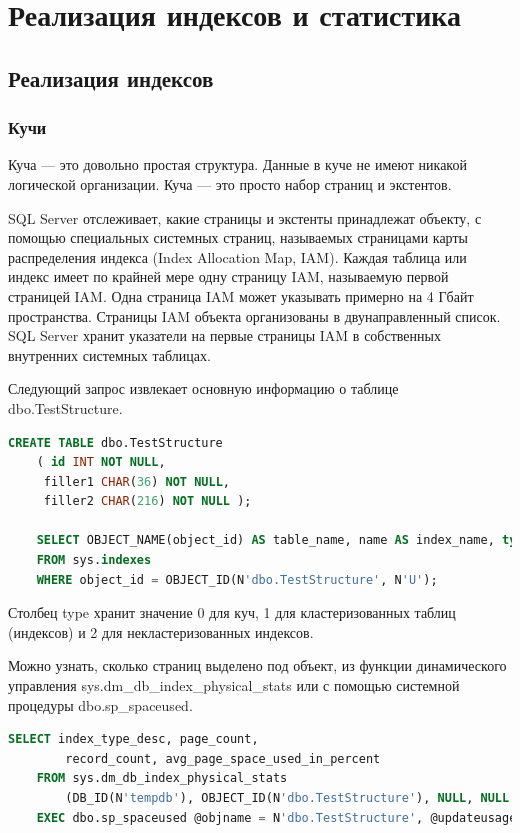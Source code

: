 \chapter{Реализация индексов и статистика}
\section{Реализация индексов}
\subsection{Кучи}

Куча — это довольно простая структура. Данные в куче не имеют никакой
логической организации. Куча — это просто набор страниц и экстентов. 

SQL Server отслеживает, какие страницы и экстенты принадлежат объекту, с помощью специальных системных страниц, называемых страницами карты распределения индекса (Index Allocation Map, IAM). Каждая таблица или индекс имеет по
крайней мере одну страницу IAM, называемую первой страницей IAM. Одна страница IAM может указывать примерно на 4 Гбайт пространства. Страницы IAM объекта организованы в двунаправленный список. SQL Server хранит указатели на первые страницы
IAM в собственных внутренних системных таблицах. 


Следующий запрос извлекает основную информацию о таблице dbo.TestStructure.

\begin{lstlisting}[label=lst:funcReturn, language=sql]
	CREATE TABLE dbo.TestStructure
	( id INT NOT NULL,
	 filler1 CHAR(36) NOT NULL,
	 filler2 CHAR(216) NOT NULL );

	SELECT OBJECT_NAME(object_id) AS table_name, name AS index_name, type, type_desc
	FROM sys.indexes
	WHERE object_id = OBJECT_ID(N'dbo.TestStructure', N'U'); 
\end{lstlisting}

Столбец type хранит значение 0 для куч, 1 для кластеризованных таблиц (индексов) и 2 для некластеризованных индексов.

Можно узнать, сколько страниц выделено под объект, из функции динамического управления sys.dm\_db\_index\_physical\_stats или с помощью системной процедуры dbo.sp\_spaceused.

\begin{lstlisting}[label=lst:funcReturn, language=sql]
	SELECT index_type_desc, page_count,
		record_count, avg_page_space_used_in_percent
   	FROM sys.dm_db_index_physical_stats
		(DB_ID(N'tempdb'), OBJECT_ID(N'dbo.TestStructure'), NULL, NULL , 'DETAILED');
   	EXEC dbo.sp_spaceused @objname = N'dbo.TestStructure', @updateusage = true;
\end{lstlisting}

